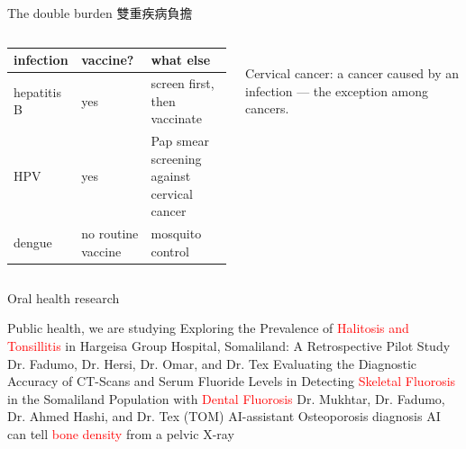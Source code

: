 \documentclass[aspectratio=169]{beamer}
\begin{document}
\begin{frame}{The double burden 雙重疾病負擔}
\begin{columns}[t]
\footnotesize
\renewcommand{\arraystretch}{1.2}
\begin{tabular}{@{}p{1.5cm}p{1.6cm}p{3.0cm}@{}}
\textbf{infection} & \textbf{vaccine?} & \textbf{what else} \\ \hline
hepatitis B & yes & screen first, then vaccinate \\
HPV & yes & Pap smear screening against cervical cancer \\
dengue & no routine vaccine & mosquito control \\
\end{tabular}\\[0.6em]
{\scriptsize Cervical cancer: a cancer caused by an infection --- the exception among cancers.}
\end{columns}
\end{frame}


\begin{frame}{Oral health research}
\begin{outline}

Public health, we are studying
    \1 Exploring the Prevalence of \textcolor{red}{Halitosis and Tonsillitis} in Hargeisa Group Hospital, Somaliland: A Retrospective Pilot Study
        \2 Dr. Fadumo, Dr. Hersi, Dr. Omar, and Dr. Tex
    \1 Evaluating the Diagnostic Accuracy of CT-Scans and Serum Fluoride Levels in Detecting \textcolor{red}{Skeletal Fluorosis} in the Somaliland Population with \textcolor{red}{Dental Fluorosis}
        \2 Dr. Mukhtar, Dr. Fadumo, Dr. Ahmed Hashi, and Dr. Tex
    \1 (TOM) AI-assistant Osteoporosis diagnosis
        \2 AI can tell \textcolor{red}{bone density} from a pelvic X-ray
\end{outline}
    
\end{frame}
\end{document}
